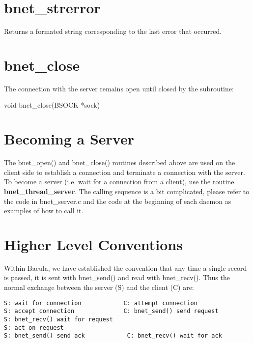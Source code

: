 \section{bnet\_strerror}

Returns a formated string corresponding to the last error that occurred. 

\section{bnet\_close}

The connection with the server remains open until closed by the subroutine: 

void bnet\_close(BSOCK *sock) 

\section{Becoming a Server}

The bnet\_open() and bnet\_close() routines described above are used on the
client side to establish a connection and terminate a connection with the
server. To become a server (i.e. wait for a connection from a client), use the
routine {\bf bnet\_thread\_server}. The calling sequence is a bit complicated,
please refer to the code in bnet\_server.c and the code at the beginning of
each daemon as examples of how to call it. 

\section{Higher Level Conventions}

Within Bacula, we have established the convention that any time a single
record is passed, it is sent with bnet\_send() and read with bnet\_recv().
Thus the normal exchange between the server (S) and the client (C) are: 

\footnotesize
\begin{verbatim}
S: wait for connection            C: attempt connection
S: accept connection              C: bnet_send() send request
S: bnet_recv() wait for request
S: act on request
S: bnet_send() send ack            C: bnet_recv() wait for ack
\end{verbatim}
\normalsize

